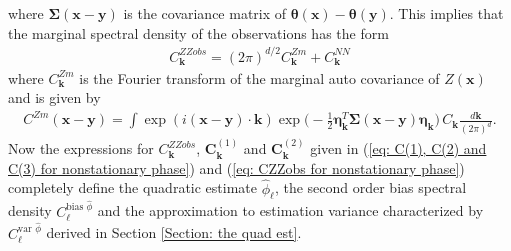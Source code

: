 \documentclass[10pt,noinfoline]{imsart}
\newcommand{\bs}{\boldsymbol}
\begin{document}
where $\bs\Sigma(\bs x-\bs y)$ is the covariance matrix of $\bs\theta(\bs x) - \bs\theta(\bs y)$.
This implies that the marginal spectral density of the observations has the form
\begin{align}
C^{ZZobs}_{\bs k} = {(2\pi)}^{d/2}C^{Zm}_{\bs k} + C^{NN}_{\bs k} \label{eq: CZZobs for nonstationary phase}
\end{align}
where $C^{Zm}_{\bs k}$ is the Fourier transform of the marginal auto covariance of $Z(\bs x)$ and is given by
\begin{align*}
C^{Zm}(\bs x-\bs y)= 
\int  \exp(i(\bs x-\bs y)\cdot \bs k)\exp\!\big(\!-{\textstyle\frac{1}{2}}\bs\eta^T_{\bs k} \bs\Sigma(\bs x-\bs y) \bs \eta_{\bs k}\big)\, C_{\bs k}\frac{d\bs k}{(2\pi)^d}.
\end{align*}
Now the expressions for $C^{ZZobs}_{\bs k}$, $\bs C_{\bs k}^{(1)}$ and $\bs C_{\bs k}^{(2)}$ given in (\ref{eq: C(1), C(2) and C(3) for nonstationary phase})  and (\ref{eq: CZZobs for nonstationary phase})
completely define the quadratic estimate $\hat\phi_{\bs \ell}$, the second order bias spectral density $C_{\bs\ell}^{\text{bias }\hat \phi}$ and the approximation to estimation variance characterized by $C_{\bs\ell}^{\text{var }\hat \phi}$ derived in Section \ref{Section: the quad est}.
\end{document}
